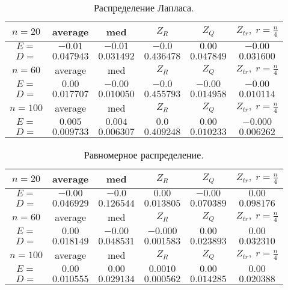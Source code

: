 \documentclass[a4]{article}
\begin{document}
\begin{table}[H]
\caption{\label{tab:laplace} Распределение Лапласа.}
\begin{center}
\begin{tabular}{|c|c|c|c|c|c|}
\hline
$n = 20$    & average & med & $Z_R$ & $Z_Q$ & $Z_{tr},\;r=\frac{n}{4}$\\ \hline 
$E = $    &  	$-0.01$  & 	$-0.01$   &	$-0.0$   &	$0.00$    &	$-0.00$   \\ \hline
$D = $     & 	$0.047943$  &  	$0.031492$    &	$0.436478$    &	$0.047849$    &	$0.031600$    \\ \hline
					
$n = 60$  & average & med & $Z_R$ & $Z_Q$ & $Z_{tr},\;r=\frac{n}{4}$\\ \hline
$E = $     & 	$0.00$    &	$-0.00$   &	$-0.0$   &	$-0.00$   &	$-0.00$   \\ \hline
$D =$      & 	$0.017707$   & 	$0.010050$   & 	$0.455793$    &	$0.014958$    &	$0.010114$    \\ \hline
					
$n = 100$   & average & med & $Z_R$ & $Z_Q$ & $Z_{tr},\;r=\frac{n}{4}$\\ \hline
$E =$      & 	$0.005$    &	$0.004$    &	$0.0$    &	$0.00$    &	$-0.000$   \\ \hline
$D = $     & 	$0.009733$    &	$0.006307$   & 	$0.409248$  &  	$0.010233$    &	$0.006262$    \\ 
\hline
\end{tabular}
\end{center}
\end{table}

\begin{table}[H]
\caption{\label{tab:uniform} Равномерное распределение.}
\begin{center}
\begin{tabular}{|c|c|c|c|c|c|}
\hline
$n = 20$  & average & med & $Z_R$ & $Z_Q$ & $Z_{tr},\;r=\frac{n}{4}$\\ \hline
$E =$       &	$-0.00$  & 	$-0.0$  & 	$0.00$    &	$-0.00$   &	$0.00$  \\ \hline  
$D =$       &	$0.046929$    &	$0.126544$    &	$0.013805$    &	$0.070389$   & 	$0.098176$    \\ \hline
					
$n = 60$  & average & med & $Z_R$ & $Z_Q$ & $Z_{tr},\;r=\frac{n}{4}$\\ \hline
$E =$       &	$0.00$   & 	$-0.00$   &	$-0.000$   &	$0.00$   & 	$0.00$    \\ \hline
$D =$       &	$0.018149$    &	$0.048531$   & 	$0.001583$    &	$0.023893$   & 	$0.032310$    \\ \hline
					
$n = 100$  & average & med & $Z_R$ & $Z_Q$ & $Z_{tr},\;r=\frac{n}{4}$\\ \hline
$E =$     &  	$0.00$    &	$0.00$    &	$0.0010 $  & 	$0.00$   & 	$0.00$    \\ \hline
$D =$    &   	$0.010555$    &	$0.029134$    &	$0.000562$   & 	$0.014285$   & 	$0.020388$    \\
\hline
\end{tabular}
\end{center}
\end{table}
\end{document}
